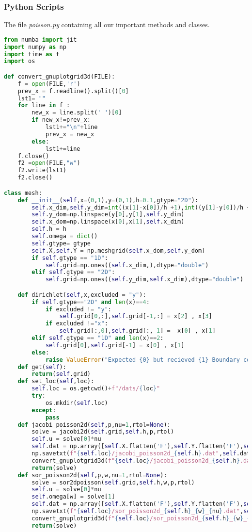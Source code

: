 \subsubsection{Python Scripts}
The file \textit{poisson.py} containing all our important methods and classes.
\begin{lstlisting}[language=Python]
from numba import jit
import numpy as np
import time as t
import os

def convert_gnuplotgrid3d(FILE):
    f = open(FILE,'r')
    prev_x = f.readline().split()[0]
    lst1= ""
    for line in f :
        new_x = line.split(' ')[0]
        if new_x!=prev_x:
            lst1+="\n"+line
            prev_x = new_x
        else:
            lst1+=line
    f.close()
    f2 =open(FILE,"w")
    f2.write(lst1)
    f2.close()

class mesh:
    def __init__(self,x=(0,1),y=(0,1),h=0.1,gtype="2D"):
        self.x_dim,self.y_dim=int((x[1]-x[0])/h +1),int((y[1]-y[0])/h +1) 
        self.y_dom=np.linspace(y[0],y[1],self.y_dim)
        self.x_dom=np.linspace(x[0],x[1],self.x_dim)
        self.h = h
        self.omega = dict()
        self.gtype= gtype 
        self.X,self.Y = np.meshgrid(self.x_dom,self.y_dom)
        if self.gtype == "1D":
            self.grid=np.ones((self.x_dim,),dtype="double")
        elif self.gtype == "2D":
            self.grid=np.ones((self.y_dim,self.x_dim),dtype="double")

    def dirichlet(self,x,excluded = "y"):
        if self.gtype=="2D" and len(x)==4:
            if excluded != "y":
                self.grid[0,:],self.grid[-1,:] = x[2] , x[3]
            if excluded !="x":
                self.grid[:,0],self.grid[:,-1] =  x[0] , x[1]
        elif self.gtype == "1D" and len(x)==2:
            self.grid[0],self.grid[-1] = x[0] , x[1]
        else:
            raise ValueError("Expected {0} but recieved {1} Boundary conditions.".format(self.gtype[0],len(x)))
    def get(self):
        return(self.grid)
    def set_loc(self,loc):
        self.loc = os.getcwd()+f"/dats/{loc}"
        try:
            os.mkdir(self.loc)
        except:
            pass
    def jacobi_poisson2d(self,p,nu=1,rtol=None):
        solve = jacobi2d(self.grid,self.h,p,rtol)
        self.u = solve[0]*nu
        self.dat = np.array([self.X.flatten('F'),self.Y.flatten('F'),self.u.flatten('F')],dtype =float)
        np.savetxt(f"{self.loc}/jacobi_poisson2d_{self.h}.dat",self.dat.T,fmt="%.20g")
        convert_gnuplotgrid3d(f"{self.loc}/jacobi_poisson2d_{self.h}.dat")
        return(solve)
    def sor_poisson2d(self,p,w,nu=1,rtol=None):
        solve = sor2dpoisson(self.grid,self.h,w,p,rtol)
        self.u = solve[0]*nu
        self.omega[w] = solve[1]
        self.dat = np.array([self.X.flatten('F'),self.Y.flatten('F'),self.u.flatten('F')],dtype =float)
        np.savetxt(f"{self.loc}/sor_poisson2d_{self.h}_{w}_{nu}.dat",self.dat.T,fmt="%.20g")
        convert_gnuplotgrid3d(f"{self.loc}/sor_poisson2d_{self.h}_{w}_{nu}.dat")
        return(solve)
    

\end{lstlisting}
